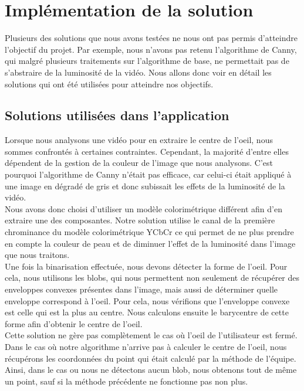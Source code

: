 \section{Implémentation de la solution}
Plusieurs des solutions que nous avons testées ne nous ont pas permis d'atteindre l'objectif du projet.
Par exemple, nous n'avons pas retenu l'algorithme de Canny, qui malgré plusieurs traitements sur l'algorithme
de base, ne permettait pas de s'abstraire de la luminosité de la vidéo.
Nous allons donc voir en détail les solutions qui ont été utilisées pour atteindre nos objectifs.

\subsection{Solutions utilisées dans l'application}
Lorsque nous analysons une vidéo pour en extraire le centre de l'oeil, nous sommes confrontés à certaines contraintes.
Cependant, la majorité d'entre elles dépendent de la gestion de la couleur de l'image que nous analysons. C'est
pourquoi l'algorithme de Canny n'était pas efficace, car celui-ci était appliqué à une image en dégradé de gris
et donc subissait les effets de la luminosité de la vidéo.\\

Nous avons donc choisi d'utiliser un modèle colorimétrique différent afin d'en extraire une des composantes.
Notre solution utilise le canal de la première chrominance du modèle colorimétrique YCbCr ce qui permet 
de ne plus prendre en compte la couleur de peau et de diminuer l'effet de la luminosité dans l'image que nous traitons.\\


Une fois la binarisation effectuée, nous devons détecter la forme de l'oeil. Pour cela, nous utilisons les blobs, qui nous
permettent non seulement de récupérer des enveloppes convexes présentes dans l'image, mais aussi de déterminer quelle enveloppe
correspond à l'oeil. Pour cela, nous vérifions que l'enveloppe convexe est celle qui est la plus au centre.
Nous calculons ensuite le barycentre de cette forme afin d'obtenir le centre de l'oeil.\\

Cette solution ne gère pas complètement le cas où l'oeil de l'utilisateur est fermé. Dans le cas où notre algorithme
n'arrive pas à calculer le centre de l'oeil, nous récupérons les coordonnées du point qui était calculé par la méthode 
de l'équipe. Ainsi, dans le cas ou nous ne détectons aucun blob, nous obtenons tout de même un point, sauf si la méthode 
précédente ne fonctionne pas non plus.

